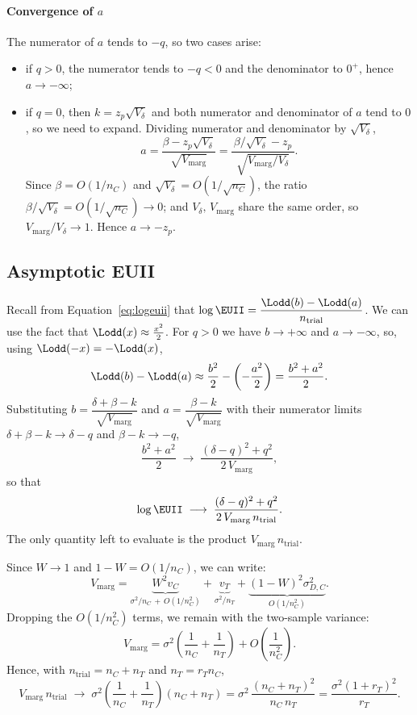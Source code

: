 \paragraph{Convergence of $a$} The numerator of $a$ tends to $-q$, so two cases arise:
\begin{itemize}
  \item if $q > 0$, the numerator tends to $-q < 0$ and the denominator to $0^+$, hence $a \to -\infty$;
  \item if $q = 0$, then $k = z_p\sqrt{V_\delta}$ and both numerator and denominator of $a$ tend to $0$, so we need to expand. Dividing numerator and denominator by $\sqrt{V_\delta}$,
  \[
    a = \frac{\beta - z_p \sqrt{V_\delta}}{\sqrt{V_{\mathrm{marg}}}}
      = \frac{\,\beta/\sqrt{V_\delta} - z_p\,}{\sqrt{V_{\mathrm{marg}}/V_\delta}} .
  \]
  Since $\beta = O(1/n_C)$ and $\sqrt{V_\delta} = O(1/\sqrt{n_C})$, the ratio $\beta/\sqrt{V_\delta} = O(1/\sqrt{n_C}) \to 0$; and $V_\delta,\,V_{\mathrm{marg}}$ share the same order, so $V_{\mathrm{marg}}/V_\delta \to 1$. Hence $a \to -z_p$.
\end{itemize}


\subsection{Asymptotic EUII}


Recall from Equation~\eqref{eq:logeuii} that $\log\EUII = \dfrac{\Lodd(b)-\Lodd(a)}{n_{\mathrm{trial}}}$. We can use the fact that $\Lodd(x)\approx\tfrac{x^2}{2}$. For $q>0$ we have $b\to+\infty$ and $a\to-\infty$, so, using $\Lodd(-x)=-\Lodd(x)$,
\[
  \Lodd(b)-\Lodd(a) \approx \frac{b^2}{2} - \left(-\frac{a^2}{2}\right) = \frac{b^2+a^2}{2}.
\]
Substituting $b=\dfrac{\delta+\beta-k}{\sqrt{V_{\mathrm{marg}}}}$ and $a=\dfrac{\beta-k}{\sqrt{V_{\mathrm{marg}}}}$ with their numerator limits $\delta+\beta-k\to\delta-q$ and $\beta-k\to-q$,
\[
  \frac{b^2+a^2}{2} \;\longrightarrow\; \frac{(\delta-q)^2+q^2}{2\,V_{\mathrm{marg}}},
\]
so that
\begin{equation}\label{eq:app_logeuii_asymp}
  \log\EUII \;\longrightarrow\; \frac{(\delta-q)^2+q^2}{2\,V_{\mathrm{marg}}\,n_{\mathrm{trial}}} .
\end{equation}
The only quantity left to evaluate is the product $V_{\mathrm{marg}}\,n_{\mathrm{trial}}$.

Since $W\to1$ and $1-W=O(1/n_C)$, we can write:
\[
  V_{\mathrm{marg}}
  = \underbrace{W^2 v_C}_{\sigma^2/n_C \,+\, O(1/n_C^2)}
  + \underbrace{v_T}_{\sigma^2/n_T}
  + \underbrace{(1-W)^2 \sigma_{D,C}^2}_{O(1/n_C^2)} .
\]
Dropping the $O(1/n_C^2)$ terms, we remain with the two-sample variance:
\[
  V_{\mathrm{marg}} = \sigma^2\!\left(\frac{1}{n_C}+\frac{1}{n_T}\right) + O\!\left(\frac{1}{n_C^2}\right).
\]
Hence, with $n_{\mathrm{trial}}=n_C+n_T$ and $n_T=r_T n_C$,
\[
  V_{\mathrm{marg}}\,n_{\mathrm{trial}}
  \;\longrightarrow\; \sigma^2\!\left(\frac{1}{n_C}+\frac{1}{n_T}\right)(n_C+n_T)
  = \sigma^2\,\frac{(n_C+n_T)^2}{n_C\, n_T}
  = \frac{\sigma^2(1+r_T)^2}{r_T} .
\]

